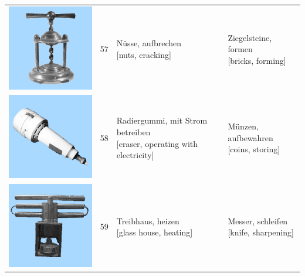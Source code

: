 \documentclass[
  english,
  man,floatsintext]{apa7}
\begin{document}
\begin{center}
\begin{ThreePartTable}
{\begin{longtable}{llll}
\includegraphics[valign=c, scale=0.23]{../materials/unfamiliar/57.png} & 57 & \makecell[l]{Nüsse, aufbrechen\\{[nuts, cracking]}} & \makecell[l]{Ziegelsteine, formen\\{[bricks, forming]}}\\
\includegraphics[valign=c, scale=0.23]{../materials/unfamiliar/58.png} & 58 & \makecell[l]{Radiergummi, mit Strom betreiben\\{[eraser, operating with electricity]}} & \makecell[l]{Münzen, aufbewahren\\{[coins, storing]}}\\
\includegraphics[valign=c, scale=0.23]{../materials/unfamiliar/59.png} & 59 & \makecell[l]{Treibhaus, heizen\\{[glass house, heating]}} & \makecell[l]{Messer, schleifen\\{[knife, sharpening]}}\\

\end{longtable}}
\end{ThreePartTable}
\end{center}
\end{document}
